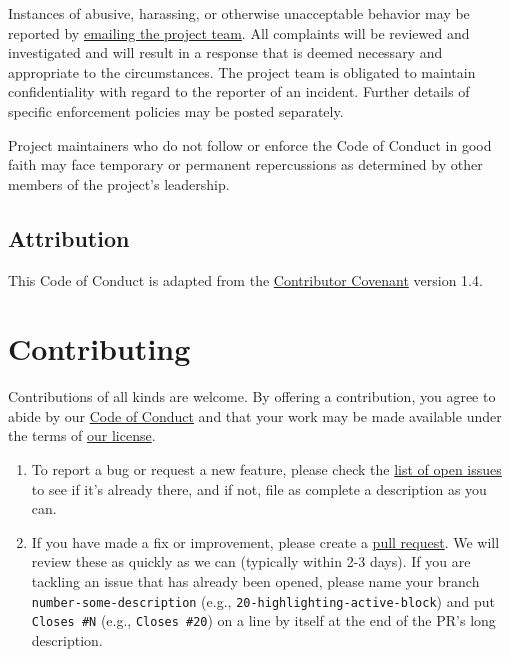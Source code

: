 \documentclass[]{Nemilov}
\begin{document}
Instances of abusive, harassing, or otherwise unacceptable behavior may be
reported by \href{mailto:gvwilson@third-bit.com}{emailing the project team}. All
complaints will be reviewed and investigated and will result in a response that
is deemed necessary and appropriate to the circumstances. The project team is
obligated to maintain confidentiality with regard to the reporter of an
incident. Further details of specific enforcement policies may be posted
separately.

Project maintainers who do not follow or enforce the Code of Conduct in good
faith may face temporary or permanent repercussions as determined by other
members of the project's leadership.

\hypertarget{conduct-attribution}{%
\section{Attribution}\label{conduct-attribution}}

This Code of Conduct is adapted from the
\href{https://www.contributor-covenant.org}{Contributor Covenant} version 1.4.

\hypertarget{contributing}{%
\chapter{Contributing}\label{contributing}}

Contributions of all kinds are welcome.
By offering a contribution, you agree to abide by our \href{CONDUCT.md}{Code of Conduct}
and that your work may be made available under the terms of \href{LICENSE.md}{our license}.

\begin{enumerate}
\def\labelenumi{\arabic{enumi}.}
\item
  To report a bug or request a new feature,
  please check the \href{https://github.com/tidyblocks/tidyblocks/issues}{list of open issues}
  to see if it's already there,
  and if not,
  file as complete a description as you can.
\item
  If you have made a fix or improvement,
  please create a \href{https://github.com/tidyblocks/tidyblocks/pulls}{pull request}.
  We will review these as quickly as we can (typically within 2-3 days).
  If you are tackling an issue that has already been opened,
  please name your branch \texttt{number-some-description}
  (e.g., \texttt{20-highlighting-active-block})
  and put \texttt{Closes\ \#N} (e.g., \texttt{Closes\ \#20})
  on a line by itself at the end of the PR's long description.
\end{enumerate}
\end{document}
